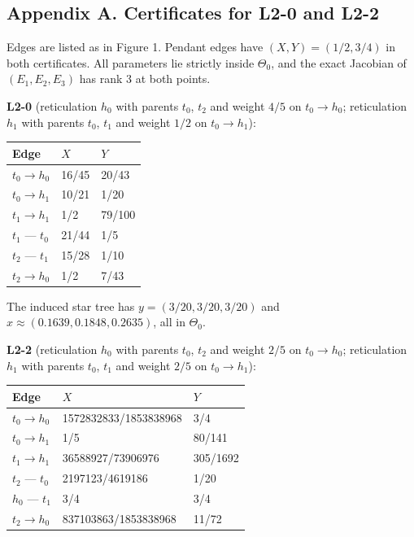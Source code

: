\documentclass[
  11pt,
]{article}
\newcounter{none} %
\begin{document}
\newpage

\subsection{Appendix A. Certificates for L2-0 and
L2-2}\label{appendix-a.-certificates-for-l2-0-and-l2-2}

Edges are listed as in Figure 1. Pendant edges have \((X,Y)=(1/2,3/4)\)
in both certificates. All parameters lie strictly inside \(\Theta_0\),
and the exact Jacobian of \((E_1,E_2,E_3)\) has rank 3 at both points.

\textbf{L2-0} (reticulation \(h_0\) with parents \(t_0\), \(t_2\) and
weight \(4/5\) on \(t_0\to h_0\); reticulation \(h_1\) with parents
\(t_0\), \(t_1\) and weight \(1/2\) on \(t_0\to h_1\)):

{\def\LTcaptype{none} %
\begin{longtable}[]{@{}lll@{}}
\toprule\noalign{}
Edge & \(X\) & \(Y\) \\
\midrule\noalign{}
\endhead
\bottomrule\noalign{}
\endlastfoot
\(t_0\to h_0\) & 16/45 & 20/43 \\
\(t_0\to h_1\) & 10/21 & 1/20 \\
\(t_1\to h_1\) & 1/2 & 79/100 \\
\(t_1\) --- \(t_0\) & 21/44 & 1/5 \\
\(t_2\) --- \(t_1\) & 15/28 & 1/10 \\
\(t_2\to h_0\) & 1/2 & 7/43 \\
\end{longtable}
}

The induced star tree has \(y=(3/20,3/20,3/20)\) and
\(x\approx(0.1639, 0.1848, 0.2635)\), all in \(\Theta_0\).

\textbf{L2-2} (reticulation \(h_0\) with parents \(t_0\), \(t_2\) and
weight \(2/5\) on \(t_0\to h_0\); reticulation \(h_1\) with parents
\(t_0\), \(t_1\) and weight \(2/5\) on \(t_0\to h_1\)):

{\def\LTcaptype{none} %
\begin{longtable}[]{@{}lll@{}}
\toprule\noalign{}
Edge & \(X\) & \(Y\) \\
\midrule\noalign{}
\endhead
\bottomrule\noalign{}
\endlastfoot
\(t_0\to h_0\) & 1572832833/1853838968 & 3/4 \\
\(t_0\to h_1\) & 1/5 & 80/141 \\
\(t_1\to h_1\) & 36588927/73906976 & 305/1692 \\
\(t_2\) --- \(t_0\) & 2197123/4619186 & 1/20 \\
\(h_0\) --- \(t_1\) & 3/4 & 3/4 \\
\(t_2\to h_0\) & 837103863/1853838968 & 11/72 \\
\end{longtable}
}
\end{document}
